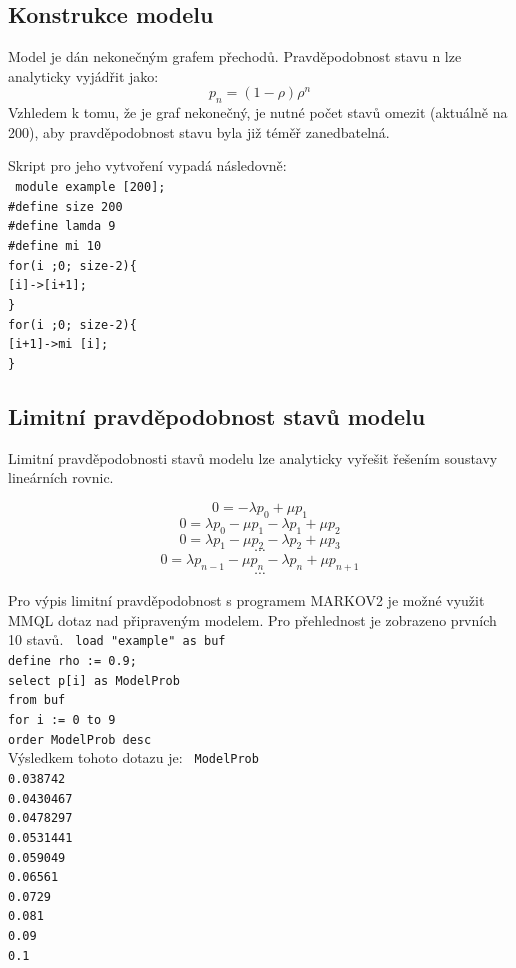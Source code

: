 \documentclass{article}
\begin{document}
\subsection{Konstrukce modelu}
Model je dán nekonečným grafem přechodů.
Pravděpodobnost stavu n lze analyticky vyjádřit jako:
$$
	p_n = (1-\rho)\rho^n
$$
Vzhledem k tomu, že je graf nekonečný, je nutné počet stavů omezit (aktuálně na 200), aby pravděpodobnost stavu byla již téměř zanedbatelná.

Skript pro jeho vytvoření vypadá následovně:\\
\newline
\texttt
{
module example [200];\\
\#define size 200\\
\#define lamda 9\\
\#define mi 10\\
\newline
for(i ;0; size-2)\{\\
	{[}i{]}->{[i+1]};\\
\}\\
\newline
for(i ;0; size-2)\{\\
	{[}i+1{]}->mi {[i]};\\
\}\\
}
\newpage
\subsection{Limitní pravděpodobnost stavů modelu}

Limitní pravděpodobnosti stavů modelu lze analyticky vyřešit řešením soustavy lineárních rovnic.

$$
0 = -\lambda p_0 + \mu p_1
$$
$$
0 =  \lambda p_0 - \mu p_1 - \lambda p_1 + \mu p_2
$$
$$
0 =  \lambda p_1 - \mu p_2 - \lambda p_2 + \mu p_3
$$
$$
\cdots
$$
$$
0 =  \lambda p_{n-1} - \mu p_{n} - \lambda p_{n} + \mu p_{n+1}
$$
$$
\cdots
$$

Pro výpis limitní pravděpodobnost s programem MARKOV2 je možné využit MMQL dotaz nad připraveným modelem. Pro přehlednost je zobrazeno prvních 10 stavů.
\newline
\newline
\texttt
{
load "example" as buf\\
define rho := 0.9;\\
select p{[i}] as ModelProb\\ 
from buf \\
for i := 0 to 9\\ 
order ModelProb desc\\
}
\newline
Výsledkem tohoto dotazu je:
\newline
\newline
\texttt
{
 ModelProb \\
 0.038742 \\
 0.0430467 \\
 0.0478297 \\
 0.0531441 \\
 0.059049 \\
 0.06561 \\
 0.0729 \\
 0.081 \\
0.09 \\
0.1 \\
}
\end{document}
